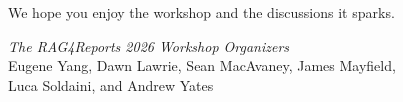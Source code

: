 \bigskip

\noindent
We hope you enjoy the workshop and the discussions it sparks.

\bigskip

\noindent
\textit{The RAG4Reports 2026 Workshop Organizers}\\
Eugene Yang, Dawn Lawrie, Sean MacAvaney, James Mayfield,\\
Luca Soldaini, and Andrew Yates
